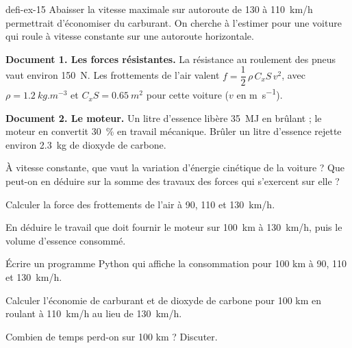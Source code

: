 \begin{blocEdition}{defi-ex-15}
Abaisser la vitesse maximale sur autoroute de 130 à \qty{110}{km/h} permettrait d'économiser du carburant. On cherche à l'estimer pour
une voiture qui roule à vitesse constante sur une autoroute horizontale.
\par\smallskip
\textbf{Document 1. Les forces résistantes.} La résistance au roulement des pneus vaut environ \qty{150}{N}. Les frottements de l'air valent
$f=\dfrac{1}{2}\,\rho\,C_x S\,v^2$, avec $\rho=\qty{1,2}{kg.m^{-3}}$ et $C_x S=\qty{0,65}{m^2}$ pour cette voiture ($v$ en \unit{m.s^{-1}}).\par\smallskip
\textbf{Document 2. Le moteur.} Un litre d'essence libère \qty{35}{MJ} en brûlant ; le moteur en convertit \qty{30}{\percent} en travail mécanique.
Brûler un litre d'essence rejette environ \qty{2,3}{kg} de dioxyde de carbone.
\begin{questions}
\item À vitesse constante, que vaut la variation d'énergie cinétique de la voiture ? Que peut-on en déduire sur la somme des travaux des
forces qui s'exercent sur elle ?
\item Calculer la force des frottements de l'air à 90, 110 et \qty{130}{km/h}.
\item En déduire le travail que doit fournir le moteur sur \qty{100}{km} à \qty{130}{km/h}, puis le volume d'essence consommé.
\item Écrire un programme Python qui affiche la consommation pour 100 km à 90, 110 et \qty{130}{km/h}.
\item Calculer l'économie de carburant et de dioxyde de carbone pour 100 km en roulant à \qty{110}{km/h} au lieu de \qty{130}{km/h}.
\item Combien de temps perd-on sur 100 km ? Discuter.
\end{questions}
\end{blocEdition}

